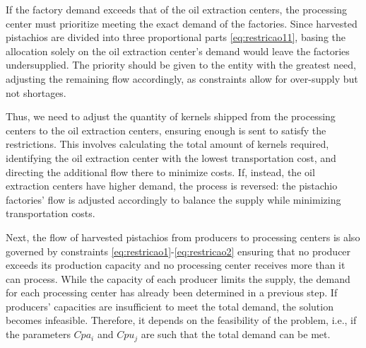 \documentclass[sn-nature]{sn-jnl}%
\theoremstyle{thmstyleone}%
\theoremstyle{thmstyletwo}%
\theoremstyle{thmstylethree}%
\begin{document}
If the factory demand exceeds that of the oil extraction centers, the processing center must prioritize meeting the exact demand of the factories. Since 
harvested pistachios are divided into three proportional parts \eqref{eq:restricao11}, basing the allocation solely on the oil extraction center’s demand would leave the factories 
undersupplied. The priority should be given to the entity with the greatest need, adjusting the remaining flow accordingly, as constraints allow for over-supply 
but not shortages.

Thus, we need to adjust the quantity of kernels shipped from the processing centers to the oil extraction centers, ensuring enough is sent to satisfy the 
restrictions. This involves calculating the total amount of kernels required, identifying the oil extraction center with the lowest transportation cost, and 
directing the additional flow there to minimize costs. If, instead, the oil extraction centers have higher demand, the process is reversed: the pistachio factories' flow is adjusted accordingly to balance 
the supply while minimizing transportation costs.

Next, the flow of harvested pistachios from producers to processing centers is also governed by constraints \eqref{eq:restricao1}-\eqref{eq:restricao2} ensuring that no producer exceeds its production 
capacity and no processing center receives more than it can process. While the capacity of each producer limits the supply, the demand for each 
processing center has already been determined in a previous step. If producers' capacities are insufficient to meet the total demand, the solution 
becomes infeasible. Therefore, it depends on the feasibility of the problem, i.e., if the parameters $Cpa_i$ and $Cpu_j$ are such that the total demand can be met.

\end{document}

